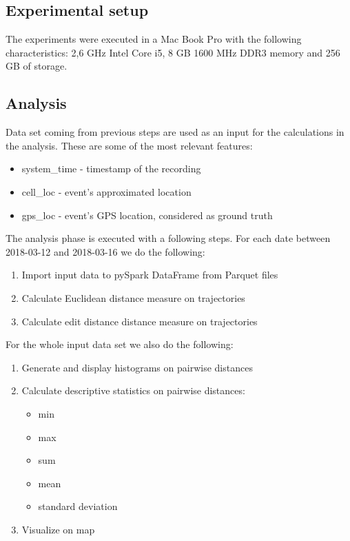 \subsection{Experimental setup}
The experiments were executed in a Mac Book Pro with the following characteristics: 2,6 GHz Intel Core i5, 8 GB 1600 MHz DDR3 memory and 256 GB of storage.

\subsection{Analysis}
Data set coming from previous steps are used as an input for the calculations in the analysis. These are some of the most relevant features:
\begin{itemize}
    \item system\_time - timestamp of the recording
    \item cell\_loc - event's approximated location
    \item gps\_loc - event's GPS location, considered as ground truth
\end{itemize}

The analysis phase is executed with a following steps. For each date between 2018-03-12 and 2018-03-16 we do the following:
\begin{enumerate}
    \item Import input data to pySpark DataFrame from Parquet files
    \item Calculate Euclidean distance measure on trajectories
    \item Calculate edit distance distance measure on trajectories
\end{enumerate}

For the whole input data set we also do the following:
\begin{enumerate}
   \item Generate and display histograms on pairwise distances
    \item Calculate descriptive statistics on pairwise distances:
        \begin{itemize}
            \item min
            \item max
            \item sum
            \item mean
            \item standard deviation
        \end{itemize}
    \item Visualize on map
\end{enumerate}
    
